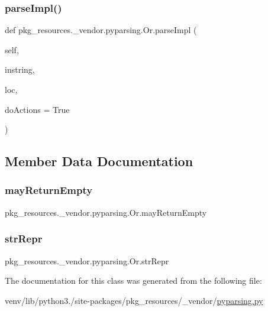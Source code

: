\subsubsection{\texorpdfstring{parse\+Impl()}{parseImpl()}}
{\footnotesize\ttfamily def pkg\+\_\+resources.\+\_\+vendor.\+pyparsing.\+Or.\+parse\+Impl (\begin{DoxyParamCaption}\item[{}]{self,  }\item[{}]{instring,  }\item[{}]{loc,  }\item[{}]{do\+Actions = {\ttfamily True} }\end{DoxyParamCaption})}



\subsection{Member Data Documentation}
\mbox{\label{classpkg__resources_1_1__vendor_1_1pyparsing_1_1Or_a796f8a67719705c07ba78e9b1dcdc5c8}} 
\subsubsection{\texorpdfstring{may\+Return\+Empty}{mayReturnEmpty}}
{\footnotesize\ttfamily pkg\+\_\+resources.\+\_\+vendor.\+pyparsing.\+Or.\+may\+Return\+Empty}

\mbox{\label{classpkg__resources_1_1__vendor_1_1pyparsing_1_1Or_a922e28b586173a8c73cdcd93fc29cd47}} 
\subsubsection{\texorpdfstring{str\+Repr}{strRepr}}
{\footnotesize\ttfamily pkg\+\_\+resources.\+\_\+vendor.\+pyparsing.\+Or.\+str\+Repr}



The documentation for this class was generated from the following file\+:\begin{DoxyCompactItemize}
\item 
venv/lib/python3./site-\/packages/pkg\+\_\+resources/\+\_\+vendor/\hyperlink{pkg__resources_2__vendor_2pyparsing_8py}{pyparsing.\+py}\end{DoxyCompactItemize}
